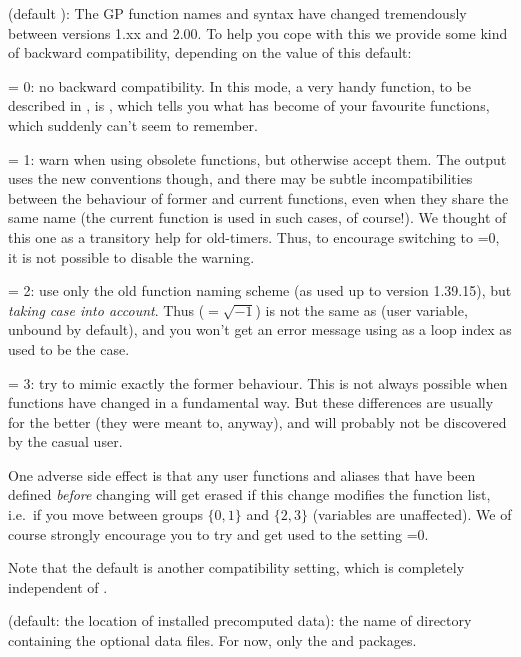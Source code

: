  (default ): The GP function names and syntax
have changed tremendously between versions 1.xx and 2.00. To help you cope
with this we provide some kind of backward compatibility, depending on the
value of this default:

\quad {} = 0: no backward compatibility. In this mode, a very
handy function, to be described in , is ,
which tells you what has become of your favourite functions, which 
suddenly can't seem to remember.

\quad {} = 1: warn when using obsolete functions, but
otherwise accept them. The output uses the new conventions though, and
there may be subtle incompatibilities between the behaviour of former and
current functions, even when they share the same name (the current function
is used in such cases, of course!). We thought of this one as a transitory
help for  old-timers. Thus, to encourage switching to =0,
it is not possible to disable the warning.

\quad {} = 2: use only the old function naming scheme (as
used up to version 1.39.15), but \emph{taking case into account}. Thus
 (${}=\sqrt{-1}$) is not the same as  (user variable, unbound
by default), and you won't get an error message using  as a loop
index as used to be the case.

\quad {} = 3: try to mimic exactly the former behaviour. This
is not always possible when functions have changed in a fundamental way.
But these differences are usually for the better (they were meant to,
anyway), and will probably not be discovered by the casual user.

One adverse side effect is that any user functions and aliases that have
been defined \emph{before} changing  will get erased if this
change modifies the function list, i.e.~if you move between groups
$\{0,1\}$ and $\{2,3\}$ (variables are unaffected). We of course strongly
encourage you to try and get used to the setting =0.

Note that the default  is another compatibility setting,
which is completely independent of .

 (default: the location of installed precomputed data):
the name of directory containing the optional data files. For now,
only the  and  packages.

